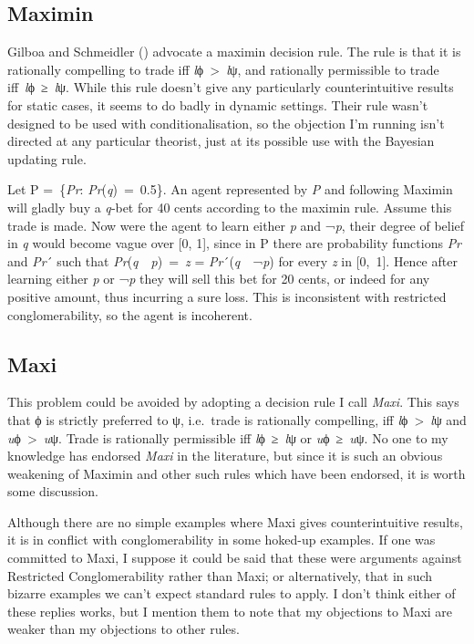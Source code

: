 \documentclass[
  11pt,
  letterpaper,
  DIV=11,
  numbers=noendperiod,
  twoside]{scrartcl}
\begin{document}
\subsection{Maximin}\label{maximin}

Gilboa and Schmeidler ()
advocate a maximin decision rule. The rule is that it is rationally
compelling to trade iff \emph{l}ϕ~\textgreater~\emph{l}ψ, and rationally
permissible to trade iff~\emph{l}ϕ~≥~\emph{l}ψ. While this rule doesn't
give any particularly counterintuitive results for static cases, it
seems to do badly in dynamic settings. Their rule wasn't designed to be
used with conditionalisation, so the objection I'm running isn't
directed at any particular theorist, just at its possible use with the
Bayesian updating rule.

Let P =~\{\emph{Pr}: \emph{Pr}(\emph{q})~=~0.5\}. An agent represented
by \emph{P} and following Maximin will gladly buy a \emph{q}‑bet for 40
cents according to the maximin rule. Assume this trade is made. Now were
the agent to learn either \emph{p} and ¬\emph{p}, their degree of belief
in \emph{q} would become vague over {[}0, 1{]}, since in P there are
probability functions \emph{Pr} and \emph{Pr}´ such that
\emph{Pr}(\emph{q}~\textbar~\emph{p})~=~\emph{z} =
\emph{Pr}´(\emph{q}~\textbar~¬\emph{p}) for every \emph{z} in
{[}0,~1{]}. Hence after learning either \emph{p} or ¬\emph{p} they will
sell this bet for 20 cents, or indeed for any positive amount, thus
incurring a sure loss. This is inconsistent with restricted
conglomerability, so the agent is incoherent.

\subsection{Maxi}\label{maxi}

This problem could be avoided by adopting a decision rule I call
\emph{Maxi}. This says that ϕ is strictly preferred to ψ, i.e.~trade is
rationally compelling, iff \emph{l}ϕ~\textgreater~\emph{l}ψ and
\emph{u}ϕ~\textgreater~\emph{u}ψ. Trade is rationally permissible iff
\emph{l}ϕ~≥~\emph{l}ψ or \emph{u}ϕ~≥~\emph{u}ψ. No one to my knowledge
has endorsed \emph{Maxi} in the literature, but since it is such an
obvious weakening of Maximin and other such rules which have been
endorsed, it is worth some discussion.

Although there are no simple examples where Maxi gives counterintuitive
results, it is in conflict with conglomerability in some hoked-up
examples. If one was committed to Maxi, I suppose it could be said that
these were arguments against Restricted Conglomerability rather than
Maxi; or alternatively, that in such bizarre examples we can't expect
standard rules to apply. I don't think either of these replies works,
but I mention them to note that my objections to Maxi are weaker than my
objections to other rules.
\end{document}
